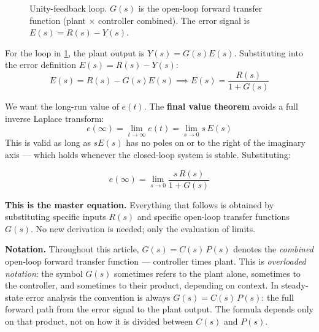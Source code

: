 \documentclass[12pt]{article}
\begin{document}
\begin{figure}[htbp]
\centering
{}
\caption{Unity-feedback loop.  $G(s)$ is the open-loop forward transfer function
  (plant $\times$ controller combined).  The error signal is $E(s) = R(s) - Y(s)$.}
\label{fig:unity_fb}
\end{figure}

For the loop in \cref{fig:unity_fb}, the plant output is $Y(s) = G(s)E(s)$.
Substituting into the error definition $E(s) = R(s) - Y(s)$:
\[
  E(s) = R(s) - G(s)E(s)
  \implies
  E(s) = \frac{R(s)}{1 + G(s)}
\]

We want the long-run value of $e(t)$.  The \textbf{final value theorem} avoids
a full inverse Laplace transform:
\[
  e(\infty) = \lim_{t \to \infty} e(t) = \lim_{s \to 0} s\,E(s)
\]
This is valid as long as $sE(s)$ has no poles on or to the right of the
imaginary axis --- which holds whenever the closed-loop system is stable.
Substituting:

\begin{equation}
  \boxed{e(\infty) = \lim_{s \to 0} \frac{s\,R(s)}{1 + G(s)}}
  \label{eq:ess_general}
\end{equation}

\textbf{This is the master equation.}  Everything that follows is obtained by
substituting specific inputs $R(s)$ and specific open-loop transfer functions
$G(s)$.  No new derivation is needed; only the evaluation of limits.

\textbf{Notation.}  Throughout this article, $G(s) = C(s)\,P(s)$ denotes the
\emph{combined} open-loop forward transfer function --- controller times plant.
This is \emph{overloaded notation}: the symbol $G(s)$ sometimes refers to the
plant alone, sometimes to the controller, and sometimes to their product,
depending on context.  In steady-state error analysis the convention is always
$G(s) = C(s)\,P(s)$: the full forward path from the error signal to the plant
output.  The formula depends only on that product, not on how it is divided
between $C(s)$ and $P(s)$.
\end{document}
